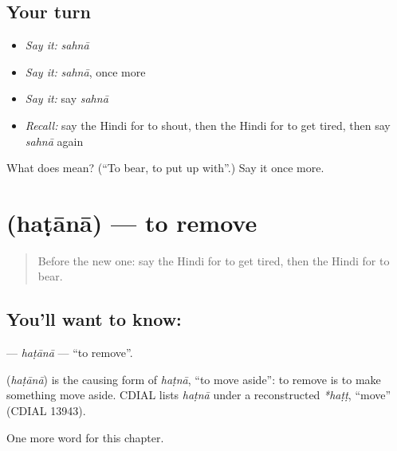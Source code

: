 \subsection*{Your turn}
\begin{itemize}
\raggedright
  \item \emph{Say it:} \emph{sahnā}
  \item \emph{Say it:} \emph{sahnā}, once more
  \item \emph{Say it:} say \emph{sahnā}
  \item \emph{Recall:} say the Hindi for to shout, then the Hindi for to get tired, then say \emph{sahnā} again
\end{itemize}

\begin{tcolorbox}[breakable,colback=teal!4,colframe=teal!35!black,title={Before you move on}]
What does  mean? (\textquotedblleft{}To bear, to put up with\textquotedblright{}.) Say it once more.
\end{tcolorbox}
\section[\texorpdfstring{\hi{हटाना} (haṭānā)}{हटाना (haṭānā)}]{ (haṭānā) — to remove}

\label{lesson:HI-C179-hatana}



\begin{quote}
Before the new one: say the Hindi for to get tired, then the Hindi for to bear.
\end{quote}

\subsection*{You'll want to know: }
\textbf{} — \emph{haṭānā} — \textquotedblleft{}to remove\textquotedblright{}.

\begin{cousinweb}
\textbf{} (\emph{haṭānā}) is the causing form of \emph{haṭnā}, \textquotedblleft{}to move aside\textquotedblright{}: to remove is to make something move aside. CDIAL lists \emph{haṭnā} under a reconstructed \emph{*haṭṭ}, \textquotedblleft{}move\textquotedblright{} (CDIAL 13943).
\end{cousinweb}

\begin{grammarlens}[title={What you've built}]
One more word for this chapter.
\end{grammarlens}

